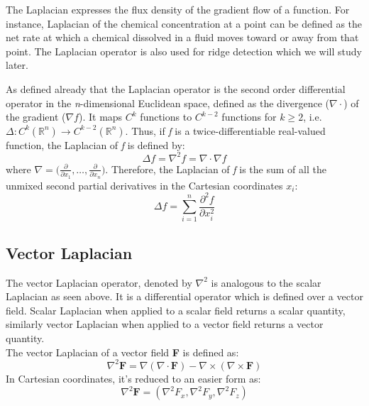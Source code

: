 The Laplacian expresses the flux density of the gradient flow of a function. For instance, Laplacian of the chemical concentration at a point can be defined as the net rate at which a chemical dissolved in a fluid moves toward or away from that point. The Laplacian operator is also used for ridge detection which we will study later.

As defined already that the Laplacian operator is the second order differential operator in the \textit{n}-dimensional Euclidean space, defined as the divergence ($ \nabla \cdot $) of the gradient ($\nabla f $). It maps $C^{k} $ functions to $C^{k-2} $ functions for $ k \geq 2$, i.e. $ \Delta: C^{k}(\mathbb{R}^{n}) \rightarrow C^{k-2}(\mathbb{R}^{n}) $. Thus, if \textit{f} is a twice-differentiable real-valued function, the Laplacian of \textit{f} is defined by:
\begin{equation}
	\Delta f = \nabla^{2} f = \nabla \cdot \nabla f
\end{equation}
where $\nabla = \big( \frac{\partial}{\partial x_{1}}, \ldots, \frac{\partial}{\partial x_{n}}  \big)  $. Therefore, the Laplacian of \textit{f} is the sum of all the unmixed second partial derivatives in the Cartesian coordinates $x_{i}$:
\begin{equation}
	\Delta f = \sum_{i=1}^{n} \frac{\partial^{2} f}{\partial x_{i}^{2}}
\end{equation}

\subsection{Vector Laplacian}
The vector Laplacian operator, denoted by $ \nabla^{2} $ is analogous to the scalar Laplacian as seen above. It is a differential operator which is defined over a vector field. Scalar Laplacian when applied to a scalar field returns a scalar quantity, similarly vector Laplacian when applied to a vector field returns a vector quantity.\\
The vector Laplacian of a vector field \textbf{F} is defined as:
\begin{equation}
	\nabla^{2} \textbf{F} = \nabla (\nabla \cdot \textbf{F}) - \nabla \times (\nabla \times \textbf{F})
\end{equation}
In Cartesian coordinates, it's reduced to an easier form as:
\begin{equation}
	\nabla^{2} \textbf{F} = (\nabla^{2} F_{x}, \nabla^{2} F_{y}, \nabla^{2} F_{z})
\end{equation}


